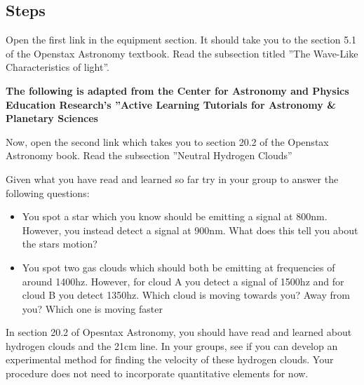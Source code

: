 \subsection{Steps}
\begin{steps}
	\item Open the first link in the equipment section. It should take you to the section 5.1 of the Openstax Astronomy textbook. Read the subsection titled ''The Wave-Like Characteristics of light''. 
	
	\textbf{The following is adapted from the Center for Astronomy and Physics Education Research's ''Active Learning Tutorials for Astronomy & Planetary Sciences}

	\item %
	
	\item Now, open the second link which takes you to section 20.2 of the Openstax Astronomy book. Read the subsection ''Neutral Hydrogen Clouds'' %
	
	\item Given what you have read and learned so far try in your group to answer the following questions:
	\begin{itemize}
		\item You spot a star which you know should be emitting a signal at 800nm. However, you instead detect a signal at 900nm. What does this tell you about the stars motion? 
		
		\item You spot two gas clouds which should both be emitting at frequencies of around 1400hz. However, for cloud A you detect a signal of 1500hz and for cloud B you detect 1350hz. Which cloud is moving towards you? Away from you? Which one is moving faster
	\end{itemize}
	
	\item In section 20.2 of  Opesntax Astronomy, you should have read and learned about hydrogen clouds and the 21cm line. In your groups, see if you can develop an experimental method for finding the velocity of these hydrogen clouds. Your procedure does not need to incorporate quantitative elements for now.

\end{steps}
	


